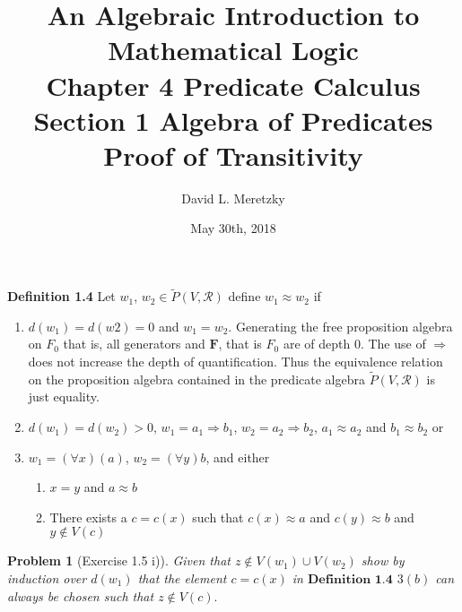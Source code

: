 \documentclass{article}
\title{ \vspace{-10ex} %
An Algebraic Introduction to Mathematical Logic\\
Chapter 4 Predicate Calculus \\
Section 1 Algebra of Predicates \\
Proof of Transitivity 
}
\author{David L. Meretzky
}
\date{%
May 30th, 2018
}
\theoremstyle{problemstyle}
\newtheorem{problem}{Problem}
\theoremstyle{lemmastyle}
\theoremstyle{theoremstyle}
\begin{document}
\maketitle

\begin{flushleft}
\textbf{Definition 1.4} Let $w_1$, $w_2 \in \widetilde{P}(V,\mathscr{R})$ define $w_1 \approx w_2$ if

\begin{enumerate}
\item $d(w_1) = d(w2) = 0$ and $w_1 = w_2$. Generating the free proposition algebra on $F_0$ that is, all generators and $\textbf{F}$, that is $F_0$ are of depth 0. The use of $\Rightarrow$ does not increase the depth of quantification. Thus the equivalence relation on the proposition algebra contained in the predicate algebra $\widetilde{P}(V,\mathscr{R})$ is just equality. 
\item $d(w_1) = d(w_2) > 0$, $w_1 = a_1 \Rightarrow b_1$, $w_2 = a_2 \Rightarrow b_2$, $a_1 \approx a_2$ and $b_1 \approx b_2$ or 
\item $w_1 = (\forall x)(a)$, $w_2 = (\forall y)b$, and either
\begin{enumerate}
\item $x = y$ and $a \approx b$   
\item There exists a $c = c(x)$ such that $c(x) \approx a$ and $c(y) \approx b$ and $y \notin V(c)$ 
\end{enumerate}
\end{enumerate}
\end{flushleft}


\begin{problem}[Exercise 1.5 i)]
Given that $z \notin V(w_1) \cup V(w_2)$ show by induction over $d(w_1)$ that the element $c = c(x)$ in $\textbf{Definition 1.4}$ $3 (b)$ can always be chosen such that $z \notin V(c).$
\end{problem}
\end{document}
